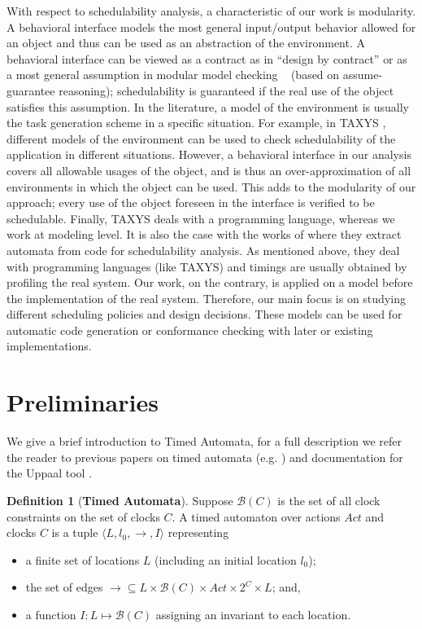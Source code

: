 \documentclass[copyright,creativecommons]{eptcs}
\theoremstyle{definition}
\newtheorem{definition}{Definition}
\newcommand{\Act}{\textit{Act}\xspace}
\newcommand{\Uppaal}{{\sc Uppaal}\xspace}
\begin{document}
With respect to schedulability analysis, a characteristic of our work is modularity. A behavioral interface models the most general input/output behavior allowed for an object and thus can be used as an abstraction of the environment. A behavioral interface can be viewed as a contract as in ``design by contract'' \cite{Meyer92} or as a most general assumption in modular model checking ~\cite{KupfermanVW01} (based on assume-guarantee reasoning); schedulability is guaranteed if the real use of the object satisfies this assumption.
In the literature,
a model of the environment is usually the task generation scheme in a specific situation. For example, in TAXYS \cite{ClossePPSVWY01}, different models of the environment can be used to check schedulability of the application in different situations. However, a behavioral interface in our analysis
covers all allowable usages of the object, and is thus an over-approximation of all environments in which the object can be used.
This adds to the modularity of our approach; every use of the object foreseen in the interface is verified to be schedulable.
Finally, TAXYS deals with a programming language, whereas we work at modeling level. It is also the case with the works of \cite{KloukinasY03} where they extract automata from code for schedulability analysis. As mentioned above, they deal with programming languages (like TAXYS) and timings are usually obtained by profiling the real system. Our work, on the contrary, is applied on a model before the implementation of the real system. Therefore, our main focus is on studying different scheduling policies and design decisions.
These models can be used for automatic code generation or conformance checking with later or existing implementations.



\section{Preliminaries}
\label{sec:prelim}

We give a brief introduction to Timed Automata, for a full description we refer the reader to previous papers on timed automata (e.g. \cite{AlurD94}) and documentation for the \Uppaal tool \cite{LarsenPY97}.

\begin{definition}[\bf Timed Automata]\label{def:timeAut}
Suppose $\mathcal{B}(C)$ is the set of all clock constraints on the set of clocks $C$. A timed automaton over actions $\Act$ and clocks $C$ is a tuple $\langle L, l_0, \longrightarrow, I \rangle$ representing
\begin{itemize}
\item a finite set of locations $L$ (including an initial location $l_0$);
\item the set of edges $\longrightarrow \subseteq L \times \mathcal{B}(C) \times \Act \times 2^C \times L$; and,
\item a function $I: L \mapsto \mathcal{B}(C)$ assigning an invariant to each location.
\end{itemize}
\end{definition}
\end{document}
